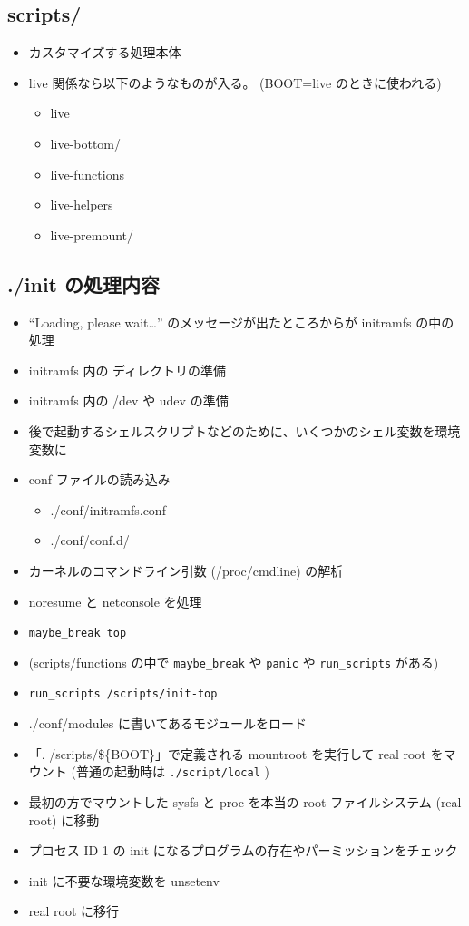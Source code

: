 \documentclass[mingoth,a4paper]{jsarticle}
\begin{document}
\subsection{scripts/}

\begin{itemize}
\item カスタマイズする処理本体
\item live 関係なら以下のようなものが入る。
  (BOOT=live のときに使われる)

\begin{itemize}
\item live
\item live-bottom/
\item live-functions
\item live-helpers
\item live-premount/
\end{itemize}

\end{itemize}
\subsection{./init の処理内容}

\begin{itemize}
\item ``Loading, please wait\ldots{}'' のメッセージが出たところからが initramfs の中の処理
\item initramfs 内の ディレクトリの準備
\item initramfs 内の /dev や udev の準備
\item 後で起動するシェルスクリプトなどのために、いくつかのシェル変数を環境変数に
\item conf ファイルの読み込み

\begin{itemize}
\item ./conf/initramfs.conf
\item ./conf/conf.d/
\end{itemize}

\item カーネルのコマンドライン引数 (/proc/cmdline) の解析
\item noresume と netconsole を処理
\item \texttt{maybe\_break top}
\item (scripts/functions の中で \texttt{maybe\_break} や \texttt{panic} や \texttt{run\_scripts} がある)
\item \texttt{run\_scripts /scripts/init-top}
\item ./conf/modules に書いてあるモジュールをロード
\item 「. /scripts/\$\{BOOT\}」で定義される mountroot を実行して real root をマウント (普通の起動時は \texttt{./script/local} )
\item 最初の方でマウントした sysfs と proc を本当の root ファイルシステム (real root) に移動
\item プロセス ID 1 の init になるプログラムの存在やパーミッションをチェック
\item init に不要な環境変数を unsetenv
\item real root に移行
\end{itemize}
\end{document}
